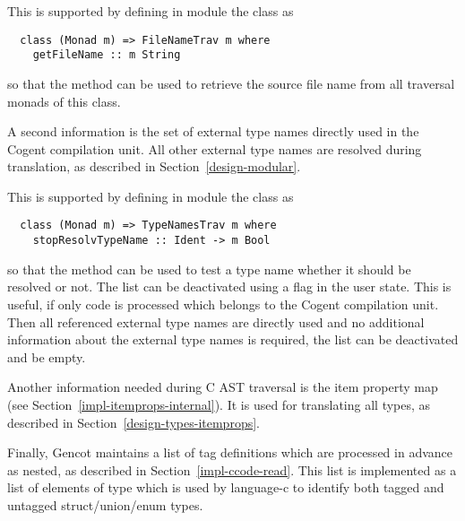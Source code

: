 This is supported by defining in module  the class  as
\begin{verbatim}
  class (Monad m) => FileNameTrav m where
    getFileName :: m String
\end{verbatim}
so that the method  can be used to retrieve the source file name from all traversal monads of 
this class. 

A second information is the set of external type names directly used in the Cogent compilation unit. All other 
external type names are resolved during translation, as described in Section~\ref{design-modular}.

This is supported by defining in module  the class  as
\begin{verbatim}
  class (Monad m) => TypeNamesTrav m where
    stopResolvTypeName :: Ident -> m Bool
\end{verbatim}
so that the method  can be used to test a type name whether it should be resolved or not.
The list can be deactivated using a flag in the user state. This is useful, if only code is processed which belongs
to the Cogent compilation unit. Then all referenced external type names are directly used and no additional information about
the external type names is required, the list can be deactivated and be empty.

Another information needed during C AST traversal is the item property map (see Section~\ref{impl-itemprops-internal}).
It is used for translating all types, as described in Section~\ref{design-types-itemprops}.

Finally, Gencot maintains a list of tag definitions which are processed in advance as nested, as described in 
Section~\ref{impl-ccode-read}. This list is implemented as a list of elements of type  which is used
by language-c to identify both tagged and untagged struct/union/enum types.

